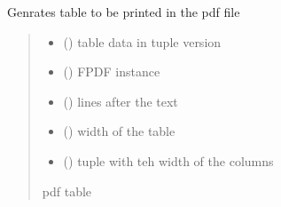 \documentclass[letterpaper,10pt,english]{sphinxmanual}
\begin{document}
\begin{fulllineitems}
\label{\detokenize{auxilary_functions:auxilary_functions.pdf_table}}
\pysigstartsignatures
{}
\pysigstopsignatures
\sphinxAtStartPar
Genrates table to be printed in the pdf file
\begin{quote}\begin{description}
\begin{itemize}
\item {} 
\sphinxAtStartPar
{} () \textendash{} table data in tuple version

\item {} 
\sphinxAtStartPar
{} () \textendash{} FPDF instance

\item {} 
\sphinxAtStartPar
{} () \textendash{} lines after the text

\item {} 
\sphinxAtStartPar
{} () \textendash{} width of the table

\item {} 
\sphinxAtStartPar
{} () \textendash{} tuple with teh width of the columns

\end{itemize}

\sphinxAtStartPar
pdf table

\end{description}\end{quote}

\end{fulllineitems}

\end{document}
